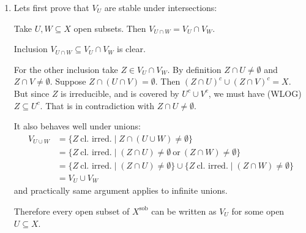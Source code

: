 \begin{exercise}{4}
    \begin{enumerate}
        \item{
                Lets first prove that $V_{U}$ are stable under
                intersections:
                \begin{claim}
                    Take $U, W \subseteq X$ open subsets. Then $V_{U \cap W} =
                    V_U \cap V_W$.
                \end{claim}
                \begin{proof_claim}
                    Inclusion $V_{U \cap W} \subseteq V_U \cap
                    V_W$ is clear.

                    For the other inclusion take $Z \in V_U \cap V_W$. By
                    definition $Z \cap U \not= \emptyset$ and $Z \cap V \not=
                    \emptyset$. Suppose $Z \cap (U \cap V) = \emptyset$. Then
                    $(Z \cap U)^c \cup (Z \cap V)^c = X$. But since $Z$ is
                    irreducible, and is covered by $U^c \cup V^c$, we must have
                    (WLOG) $Z \subseteq U^c$. That is in contradiction with
                    $Z \cap U \not= \emptyset$. 
                \end{proof_claim}

                It also behaves well under unions:
                \begin{align*}
                    V_{U \cup W} &= \{ Z\ \text{cl. irred.} \mid Z \cap (U \cup
                    W) \not= \emptyset \} \\
                    &= \{ Z\ \text{cl. irred.} \mid (Z \cap U) \not= \emptyset
                    \ \text{or}\ (Z \cap W) \not= \emptyset \} \\
                    &= \{ Z\ \text{cl. irred.} \mid (Z \cap U) \not= \emptyset
                    \} \cup \{ Z\ \text{cl. irred.} \mid (Z \cap W) \not=
                    \emptyset \} \\
                    &= V_U \cup V_W
                \end{align*}
                and practically same argument applies to infinite unions.

                Therefore every open subset of $X^{\text{sob}}$ can be written
                as $V_U$ for some open $U \subseteq X$.

}
\end{enumerate}
\end{exercise}
